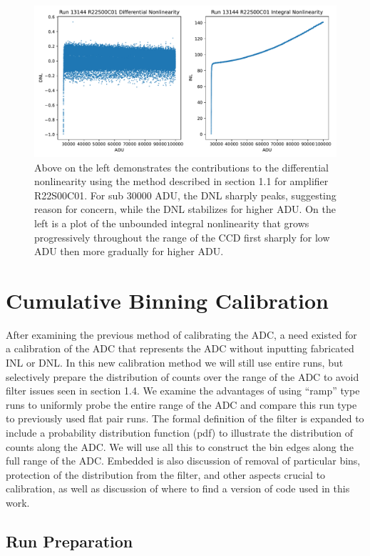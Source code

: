 \documentclass[11pt, letterpaper]{article}
\begin{document}
\begin{figure}
    \centering
    \includegraphics[width=0.5\linewidth]{inldnl.pdf}
    \caption{Above on the left demonstrates the contributions to the differential nonlinearity using the method described in section 1.1 for amplifier R22S00C01. For sub 30000 ADU, the DNL sharply peaks, suggesting reason for concern, while the DNL stabilizes for higher ADU. On the left is a plot of the unbounded integral nonlinearity that grows progressively throughout the range of the CCD first sharply for low ADU then more gradually for higher ADU.}
    \label{fig:enter-label}
\end{figure}


\section{Cumulative Binning Calibration}
\indent


After examining the previous method of calibrating the ADC, a need existed for a calibration of the ADC that represents the ADC without inputting fabricated INL or DNL. 
In this new calibration method we will still use entire runs, but selectively prepare the distribution of counts over the range of the ADC to avoid filter issues seen in section 1.4.
We examine the advantages of using “ramp” type runs to uniformly probe the entire range of the ADC and compare this run type to previously used flat pair runs.
The formal definition of the filter is expanded to include a probability distribution function (pdf) to illustrate the distribution of counts along the ADC. 
We will use all this to construct the bin edges along the full range of the ADC. 
Embedded is also discussion of removal of particular bins, protection of the distribution from the filter, and other aspects crucial to calibration, as well as discussion of where to find a version of code used in this work.

\subsection{Run Preparation}
\indent
\end{document}
